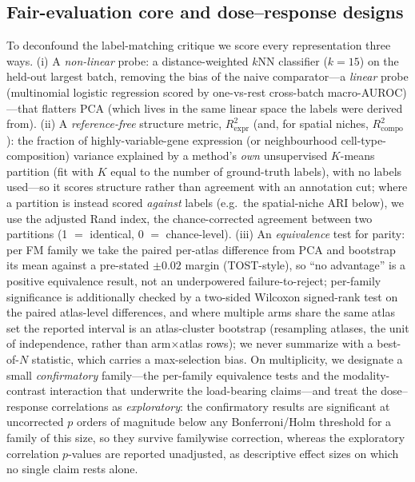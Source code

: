 \documentclass[fleqn,10pt,lineno]{wlpeerj}  %
\begin{document}
\subsection{Fair-evaluation core and dose--response designs}
To deconfound the label-matching critique we score every representation three ways. (i) A \emph{non-linear} probe: a distance-weighted $k$NN classifier ($k{=}15$) on the held-out largest batch, removing the bias of the naive comparator---a \emph{linear} probe (multinomial logistic regression scored by one-vs-rest cross-batch macro-AUROC)---that flatters PCA (which lives in the same linear space the labels were derived from). (ii) A \emph{reference-free} structure metric, $R^2_{\mathrm{expr}}$ (and, for spatial niches, $R^2_{\mathrm{compo}}$): the fraction of highly-variable-gene expression (or neighbourhood cell-type-composition) variance explained by a method's \emph{own} unsupervised $K$-means partition (fit with $K$ equal to the number of ground-truth labels), with no labels used---so it scores structure rather than agreement with an annotation cut; where a partition is instead scored \emph{against} labels (e.g.\ the spatial-niche ARI below), we use the adjusted Rand index, the chance-corrected agreement between two partitions (1 $=$ identical, 0 $=$ chance-level). (iii) An \emph{equivalence} test for parity: per FM family we take the paired per-atlas difference from PCA and bootstrap its mean against a pre-stated $\pm0.02$ margin (TOST-style), so ``no advantage'' is a positive equivalence result, not an underpowered failure-to-reject; per-family significance is additionally checked by a two-sided Wilcoxon signed-rank test on the paired atlas-level differences, and where multiple arms share the same atlas set the reported interval is an atlas-cluster bootstrap (resampling atlases, the unit of independence, rather than arm$\times$atlas rows); we never summarize with a best-of-$N$ statistic, which carries a max-selection bias. On multiplicity, we designate a small \emph{confirmatory} family---the per-family equivalence tests and the modality-contrast interaction that underwrite the load-bearing claims---and treat the dose--response correlations as \emph{exploratory}: the confirmatory results are significant at uncorrected $p$ orders of magnitude below any Bonferroni/Holm threshold for a family of this size, so they survive familywise correction, whereas the exploratory correlation $p$-values are reported unadjusted, as descriptive effect sizes on which no single claim rests alone.
\end{document}
